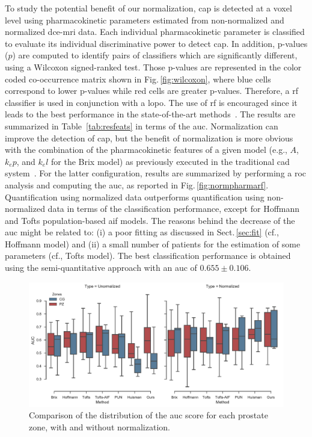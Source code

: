 To study the potential benefit of our normalization, \ac{cap} is detected at a voxel level using pharmacokinetic parameters estimated from non-normalized and normalized \ac{dce}-\ac{mri} data.
Each individual pharmacokinetic parameter is classified to evaluate its individual discriminative power to detect \ac{cap}.
In addition, p-values ($p$) are computed to identify pairs of classifiers
which are significantly different, using a Wilcoxon signed-ranked
test. Those p-values are represented in the color coded co-occurrence
matrix shown in Fig.\,\ref{fig:wilcoxon}, where blue cells correspond
to lower p-values while red cells are greater p-values.
Therefore, a \ac{rf} classifier is used in conjunction with a \ac{lopo}.
The use of \ac{rf} is encouraged since it leads to the best performance in the state-of-the-art methods~\citep{litjens2014computer,lemaitre2015computer}.
The results are summarized in Table~\ref{tab:resfeats} in terms of the \ac{auc}.
Normalization can improve the detection of \ac{cap}, but the benefit
of normalization is more obvious with the combination of the
pharmacokinetic features of a given model (e.g., $A$, $k_ep$, and
$k_el$ for the Brix model) as previously executed in the traditional \ac{cad} system~\citep{lemaitre2015computer}.
For the latter configuration, results are summarized by performing a \ac{roc} analysis and computing the \ac{auc}, as reported in Fig.\,\ref{fig:normpharmarf}.
Quantification using normalized data outperforms quantification using
non-normalized data in terms of the classification performance, except
for Hoffmann and Tofts population-based \ac{aif} models.
The reasons behind the decrease of the \ac{auc} might be related to:
(i) a poor fitting as discussed in Sect.\,\ref{sec:fit} (cf., Hoffmann
model) and (ii) a small number of patients for the estimation of some parameters (cf., Tofts model).
The best classification performance is obtained using the
semi-quantitative approach with an \ac{auc} of $0.655 \pm 0.106$.


\begin{figure}
  \centering
  \includegraphics[width=1.\linewidth]{03_experiments/figures/plot_auc_by_zones.pdf}
  \caption{Comparison of the distribution of the \acs*{auc} score for
    each prostate zone, with and without normalization.}
  \label{fig:boxplot}
\end{figure}

